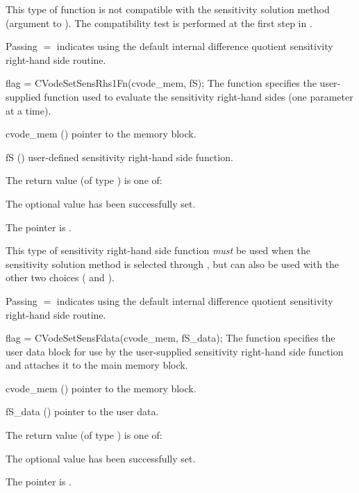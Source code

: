 {
  {\warn}This type of function is not compatible
  with the  sensitivity solution method (argument 
  to ). The compatibility test is performed at the first
  step in .

  Passing $=$ indicates using the default internal difference 
  quotient sensitivity right-hand side routine.
}
{
  flag = CVodeSetSensRhs1Fn(cvode\_mem, fS);
}
{
  The function  specifies the user-supplied {\C} function
  used to evaluate the sensitivity right-hand sides (one parameter at a time).
}
{
  \begin{args}
  \item[cvode\_mem] ()
    pointer to the {\cvodes} memory block.
  \item[fS] ()
    user-defined sensitivity right-hand side function.
  \end{args}
}
{
  The return value  (of type ) is one of:
  \begin{args}
  \item[\Id{CV\_SUCCESS}] 
    The optional value has been successfully set.
  \item[\Id{CV\_MEM\_NULL}]
    The  pointer is .
  \end{args}
}
{
  This type of sensitivity right-hand side function {\em must} be used when
  the  sensitivity solution method is selected through
  , but can also be used with the other two choices
  ( and ).

  Passing $=$ indicates using the default internal difference 
  quotient sensitivity right-hand side routine.
}
{
  flag = CVodeSetSensFdata(cvode\_mem, fS\_data);
}
{
  The function  specifies the user data block 
  for use by the user-supplied sensitivity right-hand side function and attaches 
  it to the main {\cvodes} memory block.
}
{
  \begin{args}
  \item[cvode\_mem] ()
    pointer to the {\cvodes} memory block.
  \item[fS\_data] ()
    pointer to the user data.
  \end{args}
}
{
  The return value  (of type ) is one of:
  \begin{args}
  \item[\Id{CV\_SUCCESS}] 
    The optional value has been successfully set.
  \item[\Id{CV\_MEM\_NULL}]
    The  pointer is .
  \end{args}
}
